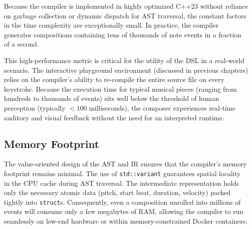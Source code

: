 Because the compiler is implemented in highly optimized C++23 without reliance on garbage collection or
dynamic dispatch for AST traversal, the constant factors in the time complexity are exceptionally small.
In practice, the compiler generates compositions containing tens of thousands of note events in a fraction of a second.

This high-performance metric is critical for the utility of the DSL in a real-world scenario. The interactive
playground environment (discussed in previous chapters) relies on the compiler's ability to re-compile the
entire source file on every keystroke. Because the execution time for typical musical pieces (ranging from
hundreds to thousands of events) sits well below the threshold of human perception (typically $<100$
milliseconds), the composer experiences real-time auditory and visual feedback without the need for an
interpreted runtime.

\subsection{Memory Footprint}

The value-oriented design of the AST and IR ensures that the compiler's memory footprint remains minimal. The
use of \texttt{std::variant} guarantees spatial locality in the CPU cache during AST traversal. The
intermediate representation holds only the necessary atomic data (pitch, start beat, duration, velocity)
packed tightly into \texttt{struct}s. Consequently, even a composition unrolled into millions of events will
consume only a few megabytes of RAM, allowing the compiler to run seamlessly on low-end hardware or within
memory-constrained Docker containers.
